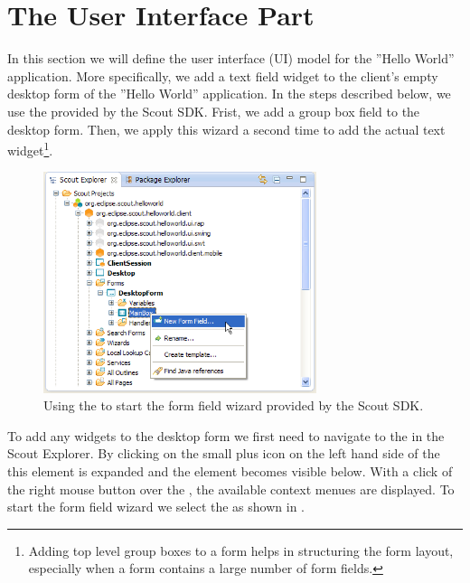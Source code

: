 \documentclass[a4paper,10pt,twoside]{book}
\begin{document}
\section{The User Interface Part}

In this section we will define the user interface (UI) model for the ''Hello World'' application.
More specifically, we add a text field widget to the client's empty desktop form of the ''Hello World'' application.
In the steps described below, we use the  provided by the Scout SDK. 
Frist, we add a group box field to the desktop form.
Then, we apply this wizard a second time to add the actual text widget\footnote{
Adding top level group boxes to a form helps in structuring the form layout, especially when a form contains a large number of form fields.
}.

\begin{figure}
\includegraphics[width=8cm]{sdk_new_field_wizard_menu.png} 
\caption{Using the  to start the form field wizard provided by the Scout SDK.}
\end{figure}

To add any widgets to the desktop form we first need to navigate to the  in the Scout Explorer.
By clicking on the small plus icon on the left hand side of the  this element is expanded and the  element becomes visible below.
With a click of the right mouse button over the , the available context menues are displayed.
To start the form field wizard we select the  as shown in .
\end{document}
